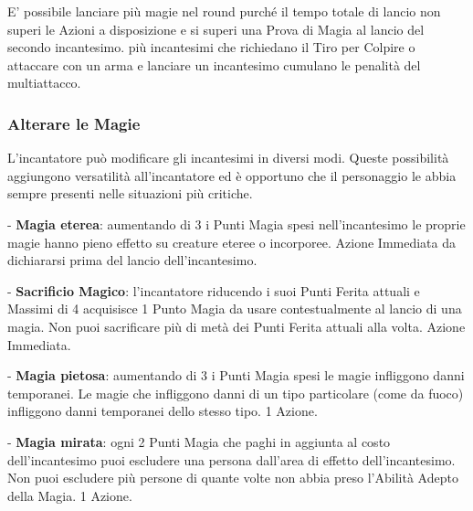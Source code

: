 \begin{multicols}{2}
E' possibile lanciare più magie nel round purché il tempo totale di lancio non superi le Azioni a disposizione e si superi una Prova di Magia al lancio del secondo incantesimo. più incantesimi che richiedano il Tiro per Colpire o attaccare con un arma e lanciare un incantesimo cumulano le penalità del multiattacco.

\subsubsection{Alterare le Magie}\label{magiealteraremagie}

L'incantatore può modificare gli incantesimi in diversi modi. Queste possibilità aggiungono versatilità all'incantatore ed è opportuno che il personaggio le abbia sempre presenti nelle situazioni più critiche.


- \textbf{Magia eterea}: aumentando di 3 i Punti Magia spesi nell'incantesimo le proprie magie hanno pieno effetto su creature eteree o incorporee. Azione Immediata da dichiararsi prima del lancio dell'incantesimo.

- \textbf{Sacrificio Magico}: l'incantatore riducendo i suoi Punti Ferita attuali e Massimi di 4 acquisisce 1 Punto Magia da usare contestualmente al lancio di una magia. Non puoi sacrificare più di metà dei Punti Ferita attuali alla volta. Azione Immediata.

- \textbf{Magia pietosa}: aumentando di 3 i Punti Magia spesi le magie infliggono danni temporanei. Le magie che infliggono danni di un tipo particolare (come da fuoco) infliggono danni temporanei dello stesso tipo. 1 Azione.

- \textbf{Magia mirata}: ogni 2 Punti Magia che paghi in aggiunta al costo dell'incantesimo puoi escludere una persona dall'area di effetto dell'incantesimo. Non puoi escludere più persone di quante volte non abbia preso l'Abilità Adepto della Magia. 1 Azione. %


\end{multicols}
